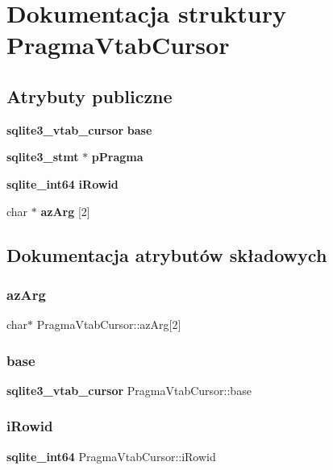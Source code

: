\section{Dokumentacja struktury Pragma\+Vtab\+Cursor}
\label{struct_pragma_vtab_cursor}
\subsection*{Atrybuty publiczne}
\begin{DoxyCompactItemize}
\item 
\textbf{ sqlite3\+\_\+vtab\+\_\+cursor} \textbf{ base}
\item 
\textbf{ sqlite3\+\_\+stmt} $\ast$ \textbf{ p\+Pragma}
\item 
\textbf{ sqlite\+\_\+int64} \textbf{ i\+Rowid}
\item 
char $\ast$ \textbf{ az\+Arg} [2]
\end{DoxyCompactItemize}


\subsection{Dokumentacja atrybutów składowych}
\mbox{\label{struct_pragma_vtab_cursor_ad2bece38661ab4a7522463275a237731}} 
\subsubsection{azArg}
{\footnotesize\ttfamily char$\ast$ Pragma\+Vtab\+Cursor\+::az\+Arg[2]}

\mbox{\label{struct_pragma_vtab_cursor_a40a25fbcbcd1fc6bd43cd7efeafdcd37}} 
\subsubsection{base}
{\footnotesize\ttfamily \textbf{ sqlite3\+\_\+vtab\+\_\+cursor} Pragma\+Vtab\+Cursor\+::base}

\mbox{\label{struct_pragma_vtab_cursor_a00362797d6825ea8ba623dfa9de693f3}} 
\subsubsection{iRowid}
{\footnotesize\ttfamily \textbf{ sqlite\+\_\+int64} Pragma\+Vtab\+Cursor\+::i\+Rowid}

